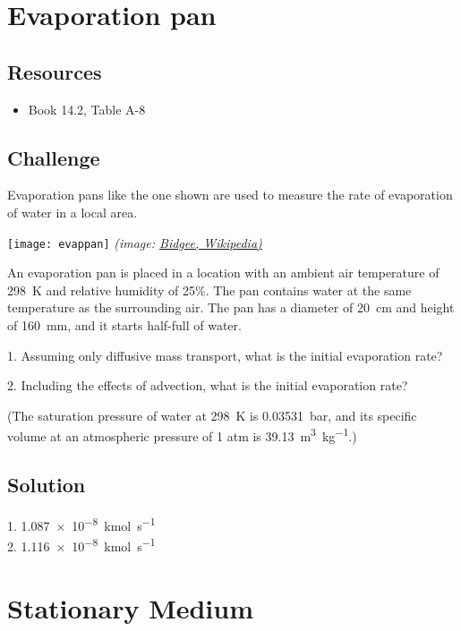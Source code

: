 \newpage
\section{Evaporation pan}

\subsection*{Resources}
\begin{itemize}
    \item Book 14.2, Table A-8
\end{itemize}

\subsection*{Challenge}
Evaporation pans like the one shown are used to measure the rate of evaporation of water in a local area.

\texttt{[image: evappan]}
\emph{(image: \href{https://commons.wikimedia.org/wiki/File:Evaporation_Pan.jpg}{Bidgee, Wikipedia)}}

An evaporation pan is placed in a location with an ambient air temperature of \SI{298}{\kelvin} and relative humidity of 25\%. The pan contains water at the same temperature as the surrounding air. The pan has a diameter of \SI{20}{\cm} and height of \SI{160}{\mm}, and it starts half-full of water.

1. Assuming only diffusive mass transport, what is the initial evaporation rate?

2. Including the effects of advection, what is the initial evaporation rate?

(The saturation pressure of water at \SI{298}{\kelvin} is \SI{0.03531}{\bar}, and its specific volume at an atmospheric pressure of  1 atm is \SI{39.13}{\meter\cubed\per\kilogram}.)

\subsection*{Solution}
1. \SI{1.087e-8}{\kilo\mol\per\second}\\
2. \SI{1.116e-8}{\kilo\mol\per\second}





\newpage
\section{Stationary Medium}

